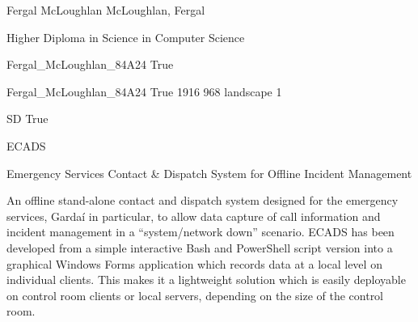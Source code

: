 
\begingroup{}\relax



\def\Key{Fergal_McLoughlan_84A24}

{Fergal McLoughlan}
{McLoughlan, Fergal}

{Higher Diploma in Science in Computer Science}

{Fergal_McLoughlan_84A24}
{True}

{Fergal_McLoughlan_84A24}
{True}
{1916}
{968}
{landscape}
{1}

{SD}
{True}

{ECADS}

{Emergency Services Contact \& Dispatch System for Offline Incident Management}

{An offline stand-alone contact and dispatch system designed for the emergency services, Gardaí in particular, to allow data capture of call information and incident management in a \textquotedblleft{}system/network down\textquotedblright{} scenario.
ECADS has been developed from a simple interactive Bash and PowerShell script version into a graphical Windows Forms application which records data at a local level on individual clients. This makes it a lightweight solution which is easily deployable on control room clients or local servers, depending on the size of the control room.}

